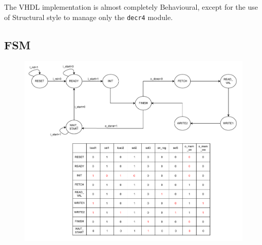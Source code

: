 \documentclass{article}
\begin{document}
The VHDL implementation is almost completely Behavioural, except for the use of Structural style to manage only the \texttt{decr4} module.

\subsection{FSM}

\begin{figure}[H]
  \centering
  \includegraphics[width=1\textwidth, trim=0cm 11cm 0cm 0cm, clip]{modulofsm.pdf}
  \label{fig:FSM}
\end{figure}
\end{document}
